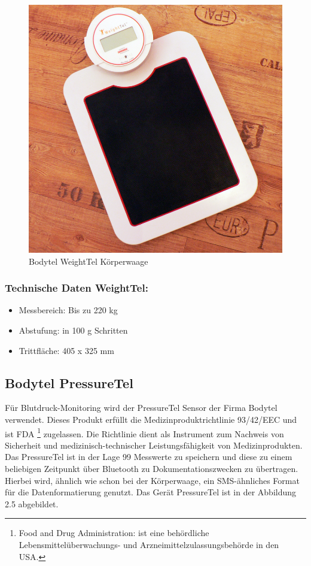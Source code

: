\begin{figure}[h]
  \centering
  \includegraphics[scale=0.3]{fotos/devices/WeightTel_koerperwaage.png}
  \caption{Bodytel WeightTel K\"orperwaage}
 
\end{figure}

\subsubsection{Technische Daten WeightTel:\cite{WeightTel}}

\begin{itemize}
 \item Messbereich: Bis zu 220 kg
 \item Abstufung: in 100 g Schritten
 \item Trittfl\"ache: 405 x  325 mm
\end{itemize}

\subsection{Bodytel PressureTel}

F\"ur Blutdruck-Monitoring wird der PressureTel Sensor der Firma Bodytel verwendet.\cite{PressureTel} 
Dieses Produkt erf\"ullt die Medizinproduktrichtlinie 93/42/EEC \cite{med_93_42} und ist FDA 
\footnote{Food and Drug Administration: ist eine beh\"ordliche Lebensmittel\"uberwachungs- und Arzneimittelzulassungsbeh\"orde in den USA\cite{FDA:01}.} zugelassen.
Die Richtlinie dient als Instrument zum Nachweis von Sicherheit und medizinisch-technischer Leistungsf\"ahigkeit von Medizinprodukten.
Das PressureTel ist in der Lage 99 Messwerte zu speichern und diese zu einem beliebigen Zeitpunkt \"uber Bluetooth
zu Dokumentationszwecken zu \"ubertragen. 
Hierbei wird, \"ahnlich wie schon bei der K\"orperwaage, ein SMS-\"ahnliches
Format f\"ur die Datenformatierung genutzt.
Das Ger\"at PressureTel ist in der Abbildung 2.5 abgebildet.\\

